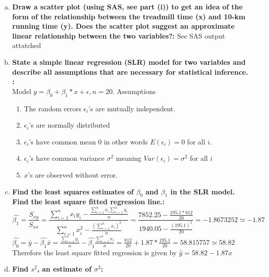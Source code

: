 \documentclass{article}
\begin{document}
\begin{enumerate}[1.]
{\begin{center}
\end{center}
}
\begin{enumerate}[(a)]
  \item \textbf{Draw a scatter plot (using SAS, see part (i)) to get an idea of the form of the relationship
between the treadmill time (x) and 10-km running time (y). Does the scatter plot suggest
an approximate linear relationship between the two variables?: }
See SAS output attatched \\
  \item \textbf{State a simple linear regression (SLR) model for two variables and describe all assumptions that are necessary for statistical inference.
: } \\
Model $y = \beta_0 + \beta_1 * x+ \epsilon, n = 20$.
Assumptions
  \begin{enumerate}[(1)]
   \item The random errors $\epsilon_i$'s are mutually independent.
   \item $\epsilon_i$'s are normally distributed
   \item $\epsilon_i$'s have common mean 0 in other words $E(\epsilon_i) = 0$ for all $i$.
   \item $\epsilon_i$'s have common variance $\sigma^2$ meaning $Var(\epsilon_i) = \sigma^2$ for all $i$
  \item $x$'s are observed without error.
\end{enumerate}
  \item \textbf{Find the least squares estimates of $\beta_0$ and $\beta_1$ in the SLR model. Find the least square
fitted regression line.: } \\
\begingroup
\Large
\begin{equation}
\hat{\beta_1} = \frac{S_{xy}}{S_{xx}} = \frac{  \sum_{i=1}^{n}{x_iy_i }  - \frac{  \sum_{i=1}^{n}{x_i}  \sum_{i=1}^{n}{y_i}  }{n} }
{  \sum_{i=1}^{n}{x_{i}^2} - \frac{    (\sum_{i=1}^{n}{x_i})^2    }{ n }}   = \frac{ 7852.25 - \frac{195.1 * 812}{20}  }{ 1940.05 - \frac{(195.1)^2 }{20} }  = -1.8673252 \simeq -1.87  \nonumber
\end{equation}
$\hat{\beta_0} = \bar{y} - \hat{\beta_1}\bar{x} = \frac{ \sum_{i=1}^{n}{y_i} }{n} - \hat{\beta_1}\frac{\sum_{i=1}^{n}{x_i} }{n} = \frac{812}{20} + 1.87 * \frac{195.1}{20} = 58.815757 \simeq 58.82 $
\endgroup
Therefore the least square fitted regression is given by $\hat{y} = 58.82 - 1.87x$ 

\item \textbf{Find $s^2$, an estimate of $\sigma^2$: } \\


\end{enumerate}
\end{enumerate}
\end{document}
